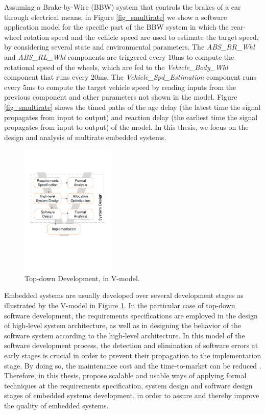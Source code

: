 Assuming a Brake-by-Wire (BBW) system that controls the brakes of a car through electrical means, in Figure \ref{fig_smultirate} we show a software application model for the specific part of the BBW system in which the rear-wheel rotation speed and the vehicle speed are used to estimate the target speed, by considering several state and environmental parameters. The \textit{ABS\_RR\_Whl} and \textit{ABS\_RL\_Whl} components are triggered every 10ms to compute the rotational speed of the wheels, which are fed to the \textit{Vehicle\_Body\_Whl} component that runs every 20ms. The \textit{Vehicle\_Spd\_Estimation} component runs every 5ms to compute the target vehicle speed by reading inputs from the previous component and other parameters not shown in the model. Figure \ref{fig_smultirate} shows the timed paths of the age delay (the latest time the signal propagates from input to output) and reaction delay (the earliest time the signal propagates from input to output) of the model. In this thesis, we focus on the design and analysis of multirate embedded systems.

\begin{figure}
\centering
\includegraphics[trim=0 0 0 0,clip,width=0.4\textwidth]{pics/vmodel.pdf}
\caption{\label{fig_vmodel}Top-down Development, in V-model.}
\vspace{-0.4cm}
\end{figure}
Embedded systems are usually developed over several development stages as illustrated by the V-model in Figure \ref{fig_vmodel}. In the particular case of top-down software development, the requirements specifications are employed in the design of high-level system architecture, as well as in designing the behavior of the software system according to the high-level architecture. In this model of the software development process, the detection and elimination of software errors at early stages is crucial in order to prevent their propagation to the implementation stage. By doing so, the maintenance cost and the time-to-market can be reduced \cite{Ebert2009EmbeddedFuture,Grimm2003SoftwareChallenges}. Therefore, in this thesis, propose scalable and usable ways of applying formal techniques at the requirements specification, system design and software design stages of embedded systems development, in order to assure and thereby improve the quality of embedded systems.

